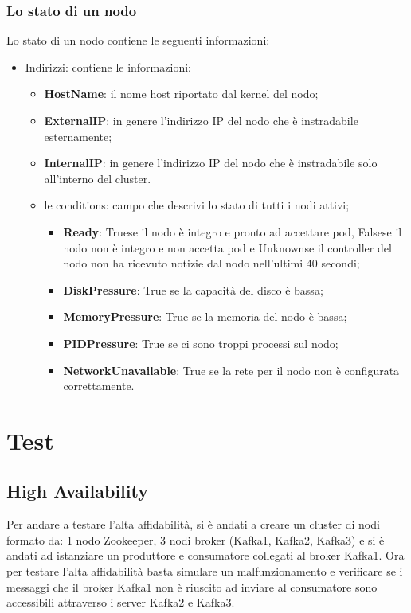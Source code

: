 \documentclass{article}
\begin{document}
\subsubsection{Lo stato di un nodo}
Lo stato di un nodo contiene le seguenti informazioni:
\begin{itemize}
    \item Indirizzi: contiene le informazioni: \begin{itemize}
        \item \textbf{HostName}: il nome host riportato dal kernel del nodo;
        \item \textbf{ExternalIP}: in genere l'indirizzo IP del nodo che è instradabile esternamente;
        \item \textbf{InternalIP}: in genere l'indirizzo IP del nodo che è instradabile solo all'interno del cluster.
    \item le conditions: campo che descrivi lo stato di tutti i nodi attivi;
        \begin{itemize}
            \item \textbf{Ready}: Truese il nodo è integro e pronto ad accettare pod, Falsese il nodo non è integro e non accetta pod e Unknownse il controller del nodo non ha ricevuto notizie dal nodo nell'ultimi 40 secondi; 
            \item \textbf{DiskPressure}: True se la capacità del disco è bassa;
            \item \textbf{MemoryPressure}: True se la memoria del nodo è bassa;
            \item \textbf{PIDPressure}: True se ci sono troppi processi sul nodo;
            \item \textbf{NetworkUnavailable}: True se la rete per il nodo non è configurata correttamente.
        \end{itemize}
    \end{itemize}
\end{itemize}
\section{Test}
\subsection{High Availability}
Per andare a testare l'alta affidabilità, si è andati a creare un cluster di nodi formato da: 1 nodo Zookeeper, 3 nodi broker (Kafka1, Kafka2, Kafka3) e si è andati ad istanziare un produttore e consumatore collegati al broker Kafka1. Ora per testare l'alta affidabilità basta simulare un malfunzionamento e verificare se i messaggi che il broker Kafka1 non è riuscito ad inviare al consumatore sono accessibili attraverso i server Kafka2 e Kafka3. 
\end{document}
